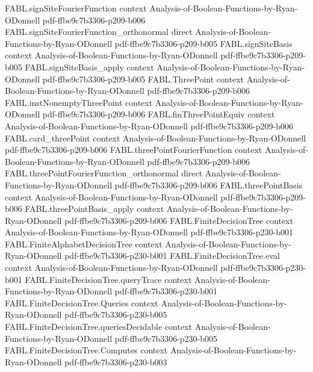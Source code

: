 \begin{theorem}
\proofstep
  {FABL.signSiteFourierFunction}
  {context}
  {Analysis-of-Boolean-Functions-by-Ryan-ODonnell}
  {pdf-ffbe9c7b3306-p209-b006}
\proofstep
  {FABL.signSiteFourierFunction_orthonormal}
  {direct}
  {Analysis-of-Boolean-Functions-by-Ryan-ODonnell}
  {pdf-ffbe9c7b3306-p209-b005}
\proofstep
  {FABL.signSiteBasis}
  {context}
  {Analysis-of-Boolean-Functions-by-Ryan-ODonnell}
  {pdf-ffbe9c7b3306-p209-b005}
\proofstep
  {FABL.signSiteBasis_apply}
  {context}
  {Analysis-of-Boolean-Functions-by-Ryan-ODonnell}
  {pdf-ffbe9c7b3306-p209-b005}
\proofstep
  {FABL.ThreePoint}
  {context}
  {Analysis-of-Boolean-Functions-by-Ryan-ODonnell}
  {pdf-ffbe9c7b3306-p209-b006}
\proofstep
  {FABL.instNonemptyThreePoint}
  {context}
  {Analysis-of-Boolean-Functions-by-Ryan-ODonnell}
  {pdf-ffbe9c7b3306-p209-b006}
\proofstep
  {FABL.finThreePointEquiv}
  {context}
  {Analysis-of-Boolean-Functions-by-Ryan-ODonnell}
  {pdf-ffbe9c7b3306-p209-b006}
\proofstep
  {FABL.card_threePoint}
  {context}
  {Analysis-of-Boolean-Functions-by-Ryan-ODonnell}
  {pdf-ffbe9c7b3306-p209-b006}
\proofstep
  {FABL.threePointFourierFunction}
  {context}
  {Analysis-of-Boolean-Functions-by-Ryan-ODonnell}
  {pdf-ffbe9c7b3306-p209-b006}
\proofstep
  {FABL.threePointFourierFunction_orthonormal}
  {direct}
  {Analysis-of-Boolean-Functions-by-Ryan-ODonnell}
  {pdf-ffbe9c7b3306-p209-b006}
\proofstep
  {FABL.threePointBasis}
  {context}
  {Analysis-of-Boolean-Functions-by-Ryan-ODonnell}
  {pdf-ffbe9c7b3306-p209-b006}
\proofstep
  {FABL.threePointBasis_apply}
  {context}
  {Analysis-of-Boolean-Functions-by-Ryan-ODonnell}
  {pdf-ffbe9c7b3306-p209-b006}
\proofstep
  {FABL.FiniteDecisionTree}
  {context}
  {Analysis-of-Boolean-Functions-by-Ryan-ODonnell}
  {pdf-ffbe9c7b3306-p230-b001}
\proofstep
  {FABL.FiniteAlphabetDecisionTree}
  {context}
  {Analysis-of-Boolean-Functions-by-Ryan-ODonnell}
  {pdf-ffbe9c7b3306-p230-b001}
\proofstep
  {FABL.FiniteDecisionTree.eval}
  {context}
  {Analysis-of-Boolean-Functions-by-Ryan-ODonnell}
  {pdf-ffbe9c7b3306-p230-b001}
\proofstep
  {FABL.FiniteDecisionTree.queryTrace}
  {context}
  {Analysis-of-Boolean-Functions-by-Ryan-ODonnell}
  {pdf-ffbe9c7b3306-p230-b001}
\proofstep
  {FABL.FiniteDecisionTree.Queries}
  {context}
  {Analysis-of-Boolean-Functions-by-Ryan-ODonnell}
  {pdf-ffbe9c7b3306-p230-b005}
\proofstep
  {FABL.FiniteDecisionTree.queriesDecidable}
  {context}
  {Analysis-of-Boolean-Functions-by-Ryan-ODonnell}
  {pdf-ffbe9c7b3306-p230-b005}
\proofstep
  {FABL.FiniteDecisionTree.Computes}
  {context}
  {Analysis-of-Boolean-Functions-by-Ryan-ODonnell}
  {pdf-ffbe9c7b3306-p230-b003}

\end{theorem}

